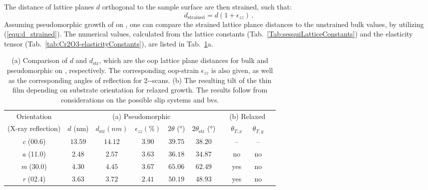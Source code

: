 The distance of lattice planes $d$ orthogonal to the sample surface are then strained, such that:
\begin{equation}
    \label{equ:d_strained}
    d_\mathrm{strained}=d(1+\epsilon_{zz})\,.
\end{equation}
Assuming pseudomorphic growth of  on , one can compare the strained lattice plance distances to the unstrained bulk values, by utilizing (\ref{equ:d_strained}).
The numerical values, calculated from the lattice constants (Tab.~\ref{Tab:sesquiLatticeConstants}) and the elasticity tensor (Tab.~\ref{tab:Cr2O3-elasticityConstants}), are listed in Tab.~\ref{tab:d_strained}a.
\begin{table}
    \centering
    \caption{
        (a) Comparison of $d$ and $d_\mathrm{str}$, which are the \gls{oop} lattice plane distances for bulk  and pseudomorphic  on , respectively.
        The corresponding \gls{oop}-strain $\epsilon_{zz}$ is also given, as well as the corresponding angles of reflection for 2\texttheta-\textomega-scans.
        (b) The resulting tilt of the thin film depending on substrate orientation for relaxed growth. The results follow from considerations on the possible slip systems and \glspl{bv}.}
    \begin{tabular}{cccccccccc}
        \toprule
        Orientation
            & \multicolumn{5}{c}{(a) Pseudomorphic}
            &&  \multicolumn{2}{c}{(b) Relaxed}
        \\
        \cmidrule(lr){2-6}
        \cmidrule(lr){8-9}
        (X-ray reflection)
            & $d$ (\si{nm}) & $d_\mathrm{str} (\si{nm})$ & $\epsilon_{zz} (\si{\percent})$
            &$2\theta$ (\si{\degree})&$2\theta_\mathrm{str}$ (\si{\degree})&& $\theta_{T,x}$   & $\theta_{T,y}$
        \\ \midrule
        \textit{c} (00.6)& $13.59$  & $14.12$   & $3.90$    & $39.75$   & $38.20$   &&--&--\\
        \textit{a} (11.0)& $2.48 $  & $2.57 $   & $3.63$    & $36.18$   & $34.87$   &&no&no\\
        \textit{m} (30.0)& $4.30 $  & $4.45 $   & $3.67$    & $65.06$   & $62.49$   &&yes&no\\
        \textit{r} (02.4)& $3.63 $  & $3.72 $   & $2.41$    & $50.19$   & $48.93$   &&yes&no\\
        \bottomrule
    \end{tabular}
    \label{tab:d_strained}
\end{table}

